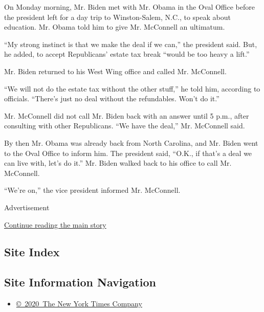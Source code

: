 On Monday morning, Mr. Biden met with Mr. Obama in the Oval Office
before the president left for a day trip to Winston-Salem, N.C., to
speak about education. Mr. Obama told him to give Mr. McConnell an
ultimatum.

``My strong instinct is that we make the deal if we can,'' the president
said. But, he added, to accept Republicans' estate tax break ``would be
too heavy a lift.''

Mr. Biden returned to his West Wing office and called Mr. McConnell.

``We will not do the estate tax without the other stuff,'' he told him,
according to officials. ``There's just no deal without the refundables.
Won't do it.''

Mr. McConnell did not call Mr. Biden back with an answer until 5 p.m.,
after consulting with other Republicans. ``We have the deal,'' Mr.
McConnell said.

By then Mr. Obama was already back from North Carolina, and Mr. Biden
went to the Oval Office to inform him. The president said, ``O.K., if
that's a deal we can live with, let's do it.'' Mr. Biden walked back to
his office to call Mr. McConnell.

``We're on,'' the vice president informed Mr. McConnell.

Advertisement

\protect\hyperlink{after-bottom}{Continue reading the main story}

\hypertarget{site-index}{%
\subsection{Site Index}\label{site-index}}

\hypertarget{site-information-navigation}{%
\subsection{Site Information
Navigation}\label{site-information-navigation}}

\begin{itemize}
\tightlist
\item
  \href{https://help.nytimes3xbfgragh.onion/hc/en-us/articles/115014792127-Copyright-notice}{©~2020~The
  New York Times Company}
\end{itemize}

